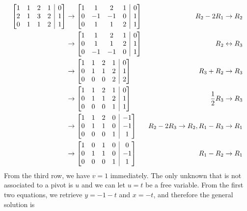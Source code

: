 \begin{solution}
\begin{align*}
\left[\begin{array}{@{}cccc|c@{}}
1 & 1 & 2 & 1 & 0\\
2 & 1 & 3 & 2 & 1\\
0 & 1 & 1 & 2 & 1
\end{array}\right] 
& \to 
\left[\begin{array}{@{}cccc|c@{}}
1 & 1 & 2 & 1 & 0\\
0 & -1 & -1 & 0 & 1\\
0 & 1 & 1 & 2 & 1
\end{array}\right] 
& R_2 - 2R_1 \to R_2 \\
& \to 
\left[\begin{array}{@{}cccc|c@{}}
1 & 1 & 2 & 1 & 0\\
0 & 1 & 1 & 2 & 1\\
0 & -1 & -1 & 0 & 1
\end{array}\right] 
& R_2 \leftrightarrow R_3 \\
& \to 
\left[\begin{array}{@{}cccc|c@{}}
1 & 1 & 2 & 1 & 0\\
0 & 1 & 1 & 2 & 1\\
0 & 0 & 0 & 2 & 2
\end{array}\right] 
& R_3+R_2 \to R_3 \\
& \to 
\left[\begin{array}{@{}cccc|c@{}}
1 & 1 & 2 & 1 & 0\\
0 & 1 & 1 & 2 & 1\\
0 & 0 & 0 & 1 & 1
\end{array}\right] 
& \frac{1}{2}R_3 \to R_3 \\
& \to 
\left[\begin{array}{@{}cccc|c@{}}
1 & 1 & 2 & 0 & -1\\
0 & 1 & 1 & 0 & -1\\
0 & 0 & 0 & 1 & 1
\end{array}\right] 
& R_2-2R_3 \to R_2, R_1-R_3 \to R_1 \\
& \to 
\left[\begin{array}{@{}cccc|c@{}}
1 & 0 & 1 & 0 & 0\\
0 & 1 & 1 & 0 & -1\\
0 & 0 & 0 & 1 & 1
\end{array}\right] 
& R_1-R_2 \to R_1
\end{align*} 
From the third row, we have $v = 1$ immediately. The only unknown that is not associated to a pivot is $u$ and we can let $u = t$ be a free variable. From the first two equations, we retrieve $y = -1-t$ and $x = -t$, and therefore the general solution is

\end{solution}
